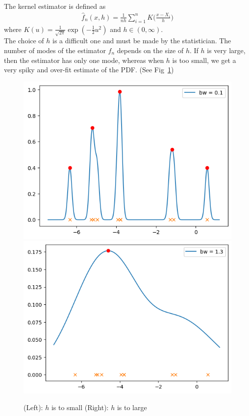 The kernel estimator is defined as 
\begin{align*}
    \hat f_n(x, h) = \frac{1}{nh}\sum_{i = 1}^n K \Big( \frac{x-X_i}{h}\Big)
\end{align*}
where $K(u) = \frac{1}{\sqrt{2\pi}}\exp(-\frac{1}{2} u^2)$ and $h \in (0, \infty)$. \\

The choice of $h$ is a difficult one and must be made by the statistician. The number of modes of the estimator $\hat f_n$ depends on the size of $h$. If $h$ is very large, then the estimator has only one mode, whereas when $h$ is too small, we get a very spiky and over-fit estimate of the PDF. (See Fig~\ref{fig:choice_h}) \\


\begin{figure}[h]
    \centering
    \includegraphics[width=0.27\paperwidth]{pictures/kernel_estim_over.png}
    \includegraphics[width=0.27\paperwidth]{pictures/kernel_estim_under.png}
    \caption{(Left): $h$ is to small (Right): $h$ is to large}
    \label{fig:choice_h}
\end{figure}



